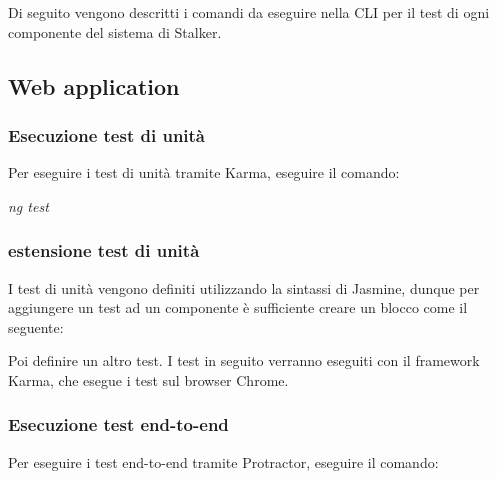 \documentclass[../manuale-manutentore.tex]{subfiles}
\begin{document}
Di seguito vengono descritti i comandi da eseguire nella CLI per il test di ogni componente del sistema di Stalker.


\subsection{Web application}%
\label{sub:}

\subsubsection{Esecuzione test di unità}%
\label{subs:esecuzione_test_di_unita}

Per eseguire i test di unità tramite Karma, eseguire il comando: \par\bigskip

\begin{center}
  \textit{ng test}
\end{center}
\par\bigskip

\subsubsection{estensione test di unità}%
\label{subs:estensione_test_unita_webapp}

I test di unità vengono definiti utilizzando la sintassi di Jasmine, dunque per aggiungere un test ad un componente è sufficiente creare un blocco come il seguente:


Poi definire un altro test.
I test in seguito verranno eseguiti con il framework Karma, che esegue i test sul browser Chrome.

\subsubsection{Esecuzione test end-to-end}%
\label{subs:esecuzione_test_end_to_end}

Per eseguire i test end-to-end tramite Protractor, eseguire il comando: \par\bigskip
\end{document}
